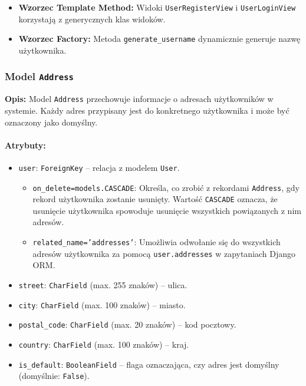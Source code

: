 \documentclass[12pt,a4paper,oneside]{article}
\theoremstyle{definition}
\numberwithin{equation}{section}
\begin{document}
\begin{itemize}
    \item \textbf{Wzorzec Template Method:} Widoki \texttt{UserRegisterView} i \texttt{UserLoginView} korzystają z generycznych klas widoków.
    \item \textbf{Wzorzec Factory:} Metoda \texttt{generate\_username} dynamicznie generuje nazwę użytkownika.
\end{itemize}

\clearpage %
\subsubsection*{Model \texttt{Address}}
\textbf{Opis:}  
Model \texttt{Address} przechowuje informacje o adresach użytkowników w systemie. Każdy adres przypisany jest do konkretnego użytkownika i może być oznaczony jako domyślny.

\paragraph{Atrybuty:}
\begin{itemize}
    \item \texttt{user}: \texttt{ForeignKey} – relacja z modelem \texttt{User}.
    \begin{itemize}
        \item \texttt{on\_delete=models.CASCADE}: Określa, co zrobić z rekordami \texttt{Address}, gdy rekord użytkownika zostanie usunięty.  
        Wartość \texttt{CASCADE} oznacza, że usunięcie użytkownika spowoduje usunięcie wszystkich powiązanych z nim adresów.
        \item \texttt{related\_name='addresses'}: Umożliwia odwołanie się do wszystkich adresów użytkownika za pomocą \texttt{user.addresses} w zapytaniach Django ORM.
    \end{itemize}
    \item \texttt{street}: \texttt{CharField} (max. 255 znaków) – ulica.
    \item \texttt{city}: \texttt{CharField} (max. 100 znaków) – miasto.
    \item \texttt{postal\_code}: \texttt{CharField} (max. 20 znaków) – kod pocztowy.
    \item \texttt{country}: \texttt{CharField} (max. 100 znaków) – kraj.
    \item \texttt{is\_default}: \texttt{BooleanField} – flaga oznaczająca, czy adres jest domyślny (domyślnie: \texttt{False}).
\end{itemize}
\end{document}
